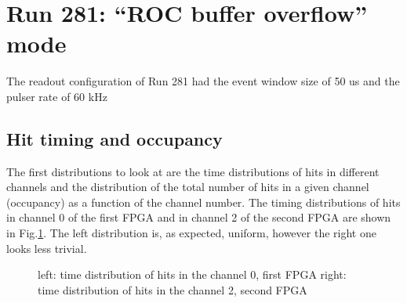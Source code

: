 \section{Run 281: ``ROC buffer overflow'' mode}
The readout configuration of Run 281 had the event window size of 50 us
and the pulser rate of 60 kHz

\subsection{Hit timing and occupancy}\label{over}
The first distributions to look at are the time distributions of hits in 
different channels and the distribution of the total number of hits
in a given channel (occupancy) as a function of the channel number.
The timing distributions of hits in channel 0 of the first FPGA
and in channel 2 of the second FPGA are shown in Fig.\ref{fig:1}.
The left distribution is, as expected, uniform, however the right one looks
less trivial.

\begin{figure}[H]
  \hspace{-0.5in}
  \caption{
    \label{fig:1}
    left:
    time distribution of hits in the channel 0, first FPGA
    right:
    time distribution of hits in the channel 2, second FPGA
    }
\end{figure}

